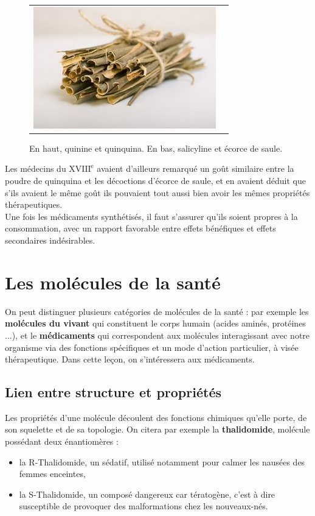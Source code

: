 \documentclass[11pt,a4paper]{report}
\begin{document}
\begin{figure}[h!]
\begin{center}
\begin{tabular}{cc}
   		\includegraphics[scale = 0.7]{saule.png}\\
	\end{tabular}
	\caption{En haut, quinine et quinquina. En bas, salicyline et écorce de saule.}
	\end{center}
\end{figure}

Les médecins du $\text{XVIII}^\text{e}$ avaient d'ailleurs remarqué un goût similaire entre la poudre de quinquina et les décoctions d'écorce de saule, et en avaient déduit que s'ils avaient le même goût ils pouvaient tout aussi bien avoir les mêmes propriétés thérapeutiques.\\

Une fois les médicaments synthétisés, il faut s'assurer qu'ils soient propres à la consommation, avec un rapport favorable entre effets bénéfiques et effets secondaires indésirables. 

\newpage
\section{Les molécules de la santé}\label{sec:1}

On peut distinguer plusieurs catégories de molécules de la santé : par exemple les \textbf{molécules du vivant} qui constituent le corps humain (acides aminés, protéines ...), et le \textbf{médicaments} qui correspondent aux molécules interagissant avec notre organisme via des fonctions spécifiques et un mode d'action particulier, à visée thérapeutique. Dans cette leçon, on s'intéressera aux médicaments.\\

\subsection{Lien entre structure et propriétés}

Les propriétés d'une molécule découlent des fonctions chimiques qu'elle porte, de son squelette et de sa topologie. On citera par exemple la \textbf{thalidomide}, molécule possédant deux énantiomères :
\begin{itemize}
	\item la R-Thalidomide, un sédatif, utilisé notamment pour calmer les nausées des femmes enceintes,
	\item la S-Thalidomide, un composé dangereux car tératogène, c'est à dire susceptible de provoquer des malformations chez les nouveaux-nés.
\end{itemize}
\end{document}
